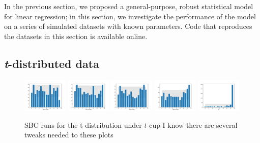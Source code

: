 \documentclass[fleqn,usenatbib]{mnras}
\begin{document}
In the previous section, we proposed a general-purpose, robust statistical model
for linear regression; in this section, we investigate the performance of the
model on a series of simulated datasets with known parameters. Code that
reproduces the datasets in this section is available online\footnotemark.


\subsection{\textit{t}-distributed data}
\label{sec:results.t}

\begin{figure}
    \includegraphics[width=0.19\textwidth]{graphics/sbc_t/alpha_scaled.pdf}
    \includegraphics[width=0.19\textwidth]{graphics/sbc_t/beta_scaled.0.pdf}
    \includegraphics[width=0.19\textwidth]{graphics/sbc_t/beta_scaled.1.pdf}
    \includegraphics[width=0.19\textwidth]{graphics/sbc_t/sigma_scaled.pdf}
    \includegraphics[width=0.19\textwidth]{graphics/sbc_t/nu.pdf}
    \caption{SBC runs for the t distribution under $t$-cup {\color{red} I know
    there are several tweaks needed to these plots}}
    \label{fig:results.t.sbc}
\end{figure}
\end{document}
